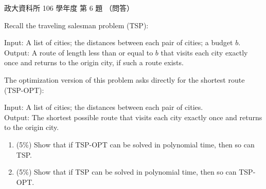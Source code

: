 \begin{pastexam}[label={px:nccu-106-dsa-06}]{政大資科所 106 學年度 第 6 題}
（問答）

Recall the traveling salesman problem (TSP):

\hspace*{1.5em}Input: A list of cities; the distances between each pair of cities; a budget $b$.\\
\hspace*{1.5em}Output: A route of length less than or equal to $b$ that visits each city exactly
once and returns to the origin city, if such a route exists.

The optimization version of this problem asks directly for the shortest route (TSP-OPT):

\hspace*{1.5em}Input: A list of cities; the distances between each pair of cities.\\
\hspace*{1.5em}Output: The shortest possible route that visits each city exactly once and returns
to the origin city.
\begin{enumerate}[label=\Alph*.]
\item (5\%) Show that if TSP-OPT can be solved in polynomial time, then so can TSP.
\item (5\%) Show that if TSP can be solved in polynomial time, then so can TSP-OPT.
\end{enumerate}
\end{pastexam}

